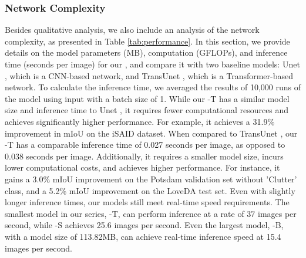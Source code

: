 \documentclass[journal]{IEEEtran}
\begin{document}
\subsubsection{\textbf{Network Complexity}}
Besides qualitative analysis, we also include an analysis of the network complexity, as presented in Table \ref{tab:performance}. In this section, we provide details on the model parameters (MB), computation (GFLOPs), and inference time (seconds per image) for our \model, and compare it with two baseline models: Unet \cite{ronneberger2015u}, which is a CNN-based network, and TransUnet \cite{chen2021transunet}, which is a Transformer-based network. To calculate the inference time, we averaged the results of 10,000 runs of the model using  input with a batch size of 1. While our \model-T has a similar model size and inference time to Unet \cite{ronneberger2015u}, it requires fewer computational resources and achieves significantly higher performance. For example, it achieves a 31.9\% improvement in mIoU on the iSAID dataset. When compared to TransUnet \cite{chen2021transunet}, our \model-T has a comparable inference time of 0.027 seconds per image, as opposed to 0.038 seconds per image. Additionally, it requires a smaller model size, incurs lower computational costs, and achieves higher performance. For instance, it gains a 3.0\% mIoU improvement on the Potsdam validation set without 'Clutter' class, and a 5.2\% mIoU improvement on the LoveDA test set. Even with slightly longer inference times, our models still meet real-time speed requirements. The smallest model in our series, \model-T, can perform inference at a rate of 37 images per second, while \model-S achieves 25.6 images per second. Even the largest model, \model-B, with a model size of 113.82MB, can achieve real-time inference speed at 15.4 images per second.


\begin{table}[h]
\centering
\caption{Performance comparison of our models with different sizes of the backbone.}
\renewcommand{\arraystretch}{1.2}

\label{tab:performance}
\end{table}
\end{document}
